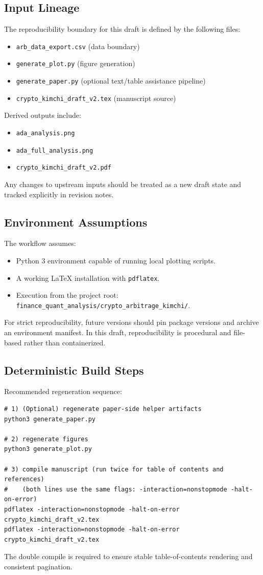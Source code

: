 \documentclass[11pt,a4paper]{article}
\begin{document}
\subsection{Input Lineage}
The reproducibility boundary for this draft is defined by the following files:
\begin{itemize}
    \item \texttt{arb\_data\_export.csv} (data boundary)
    \item \texttt{generate\_plot.py} (figure generation)
    \item \texttt{generate\_paper.py} (optional text/table assistance pipeline)
    \item \texttt{crypto\_kimchi\_draft\_v2.tex} (manuscript source)
\end{itemize}
Derived outputs include:
\begin{itemize}
    \item \texttt{ada\_analysis.png}
    \item \texttt{ada\_full\_analysis.png}
    \item \texttt{crypto\_kimchi\_draft\_v2.pdf}
\end{itemize}
Any changes to upstream inputs should be treated as a new draft state and tracked explicitly in revision notes.

\subsection{Environment Assumptions}
The workflow assumes:
\begin{itemize}
    \item Python 3 environment capable of running local plotting scripts.
    \item A working LaTeX installation with \texttt{pdflatex}.
    \item Execution from the project root:
    \texttt{finance\_quant\_analysis/crypto\_arbitrage\_kimchi/}.
\end{itemize}
For strict reproducibility, future versions should pin package versions and archive an environment manifest. In this draft, reproducibility is procedural and file-based rather than containerized.

\subsection{Deterministic Build Steps}
Recommended regeneration sequence:
\begin{verbatim}
# 1) (Optional) regenerate paper-side helper artifacts
python3 generate_paper.py

# 2) regenerate figures
python3 generate_plot.py

# 3) compile manuscript (run twice for table of contents and references)
#    (both lines use the same flags: -interaction=nonstopmode -halt-on-error)
pdflatex -interaction=nonstopmode -halt-on-error crypto_kimchi_draft_v2.tex
pdflatex -interaction=nonstopmode -halt-on-error crypto_kimchi_draft_v2.tex
\end{verbatim}
The double compile is required to ensure stable table-of-contents rendering and consistent pagination.
\end{document}
